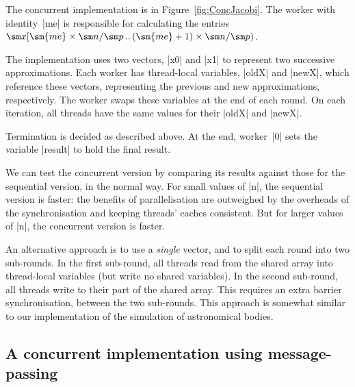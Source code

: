
The concurrent implementation is in Figure~\ref{fig:ConcJacobi}.  The worker
with identity~|me| is responsible for calculating the entries $\sm x
\interval{\sm{me} \times \sm n / \sm p}{(\sm{me}+1) \times \sm n / \sm p}$.

The implementation uses two vectors, |x0| and |x1| to represent two successive
approximations.  Each worker has thread-local variables, |oldX| and |newX|,
which reference these vectors, representing the previous and new
approximations, respectively.  The worker swaps these variables at the end of
each round.  On each iteration, all threads have the same values for their
|oldX| and |newX|.

Termination is decided as described above.  At the end, worker~|0| sets the
variable |result| to hold the final result.

We can test the concurrent version by comparing its results against those for
the sequential version, in the normal way.  For small values of |n|, the
sequential version is faster: the benefits of parallelisation are outweighed
by the overheads of the synchronisation and keeping threads' caches
consistent.  But for larger values of |n|, the concurrent version is faster.




An alternative approach is to use a \emph{single} vector, and to split each
round into two sub-rounds.  In the first sub-round, all threads read from the
shared array into thread-local variables (but write no shared variables).  In
the second sub-round, all threads write to their part of the shared array.
This requires an extra barrier synchronisation, between the two sub-rounds.
This approach is somewhat similar to our implementation of the simulation of
astronomical bodies. 



\subsection{A concurrent implementation using message-passing}

